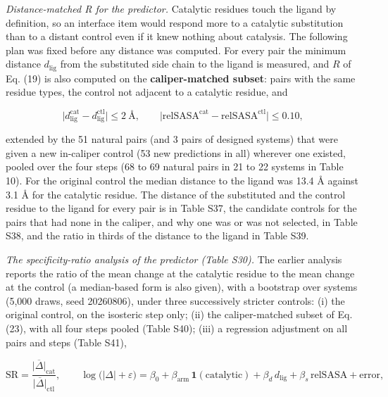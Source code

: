 \documentclass[
  10pt,
]{article}
\DeclareRobustCommand{\_}{\textunderscore\hspace{0pt}}
\begin{document}
\emph{Distance-matched
R for the
predictor.}
Catalytic residues
touch the ligand by
definition, so an
interface item would
respond more to a
catalytic
substitution than to
a distant control
even if it knew
nothing about
catalysis. The
following plan was
fixed before any
distance was
computed. For every
pair the minimum
distance
\(d_{\mathrm{lig}}\)
from the substituted
side chain to the
ligand is measured,
and \(R\) of Eq.
(19) is also
computed on the
\textbf{caliper-matched
subset}: pairs with
the same residue
types, the control
not adjacent to a
catalytic residue,
and

\begin{equation*}\big\lvert d^{\mathrm{cat}}_{\mathrm{lig}} - d^{\mathrm{ctl}}_{\mathrm{lig}}\big\rvert \le 2\ \text{Å}, \qquad \big\lvert \mathrm{relSASA}^{\mathrm{cat}} - \mathrm{relSASA}^{\mathrm{ctl}}\big\rvert \le 0.10, \tag{23}\end{equation*}

extended by the 51
natural pairs (and 3
pairs of designed
systems) that were
given a new
in-caliper control
(53 new predictions
in all) wherever one
existed, pooled over
the four steps (68
to 69 natural pairs
in 21 to 22 systems
in Table 10). For
the original control
the median distance
to the ligand was
13.4 Å against 3.1 Å
for the catalytic
residue. The
distance of the
substituted and the
control residue to
the ligand for every
pair is in Table
S37, the candidate
controls for the
pairs that had none
in the caliper, and
why one was or was
not selected, in
Table S38, and the
ratio in thirds of
the distance to the
ligand in Table S39.

\emph{The
specificity-ratio
analysis of the
predictor (Table
S30).} The earlier
analysis reports the
ratio of the mean
change at the
catalytic residue to
the mean change at
the control (a
median-based form is
also given), with a
bootstrap over
systems (5,000
draws, seed
20260806), under
three successively
stricter controls:
(i) the original
control, on the
isosteric step only;
(ii) the
caliper-matched
subset of Eq. (23),
with all four steps
pooled (Table S40);
(iii) a regression
adjustment on all
pairs and steps
(Table S41),

\begin{equation*}\mathrm{SR} = \frac{\overline{\lvert\Delta\rvert}_{\mathrm{cat}}}{\overline{\lvert\Delta\rvert}_{\mathrm{ctl}}}, \qquad \log\big(\lvert\Delta\rvert + \varepsilon\big) = \beta_0 + \beta_{\mathrm{arm}}\,\mathbf{1}(\text{catalytic}) + \beta_d\, d_{\mathrm{lig}} + \beta_s\, \mathrm{relSASA} + \text{error}, \tag{24}\end{equation*}
\end{document}
